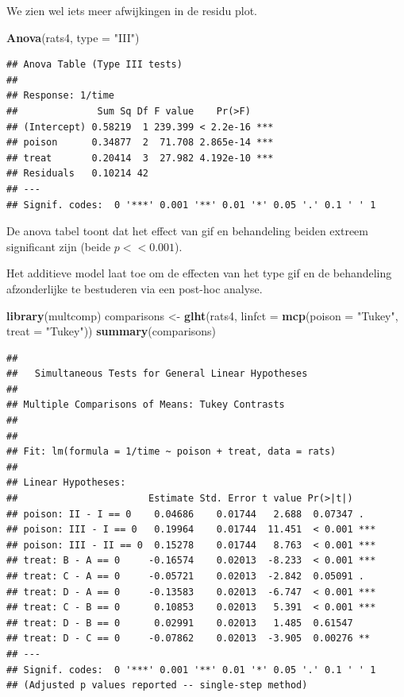 \documentclass[
  12pt,dutch]{book}
\newenvironment{Shaded}{\begin{snugshade}}{\end{snugshade}}
\newcommand{\AttributeTok}[1]{\textcolor[rgb]{0.13,0.29,0.53}{#1}}
\newcommand{\FunctionTok}[1]{\textcolor[rgb]{0.13,0.29,0.53}{\textbf{#1}}}
\newcommand{\NormalTok}[1]{#1}
\newcommand{\OtherTok}[1]{\textcolor[rgb]{0.56,0.35,0.01}{#1}}
\newcommand{\StringTok}[1]{\textcolor[rgb]{0.31,0.60,0.02}{#1}}
\theoremstyle{definition}
\theoremstyle{definition}
\theoremstyle{definition}
\theoremstyle{definition}
\theoremstyle{remark}
\begin{document}
We zien wel iets meer afwijkingen in de residu plot.

\begin{Shaded}
\begin{Highlighting}[]
\FunctionTok{Anova}\NormalTok{(rats4, }\AttributeTok{type =} \StringTok{"III"}\NormalTok{)}
\end{Highlighting}
\end{Shaded}

\begin{verbatim}
## Anova Table (Type III tests)
## 
## Response: 1/time
##              Sum Sq Df F value    Pr(>F)    
## (Intercept) 0.58219  1 239.399 < 2.2e-16 ***
## poison      0.34877  2  71.708 2.865e-14 ***
## treat       0.20414  3  27.982 4.192e-10 ***
## Residuals   0.10214 42                      
## ---
## Signif. codes:  0 '***' 0.001 '**' 0.01 '*' 0.05 '.' 0.1 ' ' 1
\end{verbatim}

De anova tabel toont dat het effect van gif en behandeling beiden extreem significant zijn (beide \(p<< 0.001\)).

Het additieve model laat toe om de effecten van het type gif en de behandeling afzonderlijke te bestuderen via een post-hoc analyse.

\begin{Shaded}
\begin{Highlighting}[]
\FunctionTok{library}\NormalTok{(multcomp)}
\NormalTok{comparisons }\OtherTok{\textless{}{-}} \FunctionTok{glht}\NormalTok{(rats4, }\AttributeTok{linfct =} \FunctionTok{mcp}\NormalTok{(}\AttributeTok{poison =} \StringTok{"Tukey"}\NormalTok{,}
    \AttributeTok{treat =} \StringTok{"Tukey"}\NormalTok{))}
\FunctionTok{summary}\NormalTok{(comparisons)}
\end{Highlighting}
\end{Shaded}

\begin{verbatim}
## 
##   Simultaneous Tests for General Linear Hypotheses
## 
## Multiple Comparisons of Means: Tukey Contrasts
## 
## 
## Fit: lm(formula = 1/time ~ poison + treat, data = rats)
## 
## Linear Hypotheses:
##                       Estimate Std. Error t value Pr(>|t|)    
## poison: II - I == 0    0.04686    0.01744   2.688  0.07347 .  
## poison: III - I == 0   0.19964    0.01744  11.451  < 0.001 ***
## poison: III - II == 0  0.15278    0.01744   8.763  < 0.001 ***
## treat: B - A == 0     -0.16574    0.02013  -8.233  < 0.001 ***
## treat: C - A == 0     -0.05721    0.02013  -2.842  0.05091 .  
## treat: D - A == 0     -0.13583    0.02013  -6.747  < 0.001 ***
## treat: C - B == 0      0.10853    0.02013   5.391  < 0.001 ***
## treat: D - B == 0      0.02991    0.02013   1.485  0.61547    
## treat: D - C == 0     -0.07862    0.02013  -3.905  0.00276 ** 
## ---
## Signif. codes:  0 '***' 0.001 '**' 0.01 '*' 0.05 '.' 0.1 ' ' 1
## (Adjusted p values reported -- single-step method)
\end{verbatim}
\end{document}
